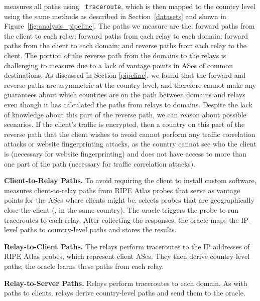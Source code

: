 \system{} measures all paths using {\tt 
traceroute}, which is then mapped to the country level using the same methods as 
described in Section~\ref{datasets} and shown in Figure~\ref{fig:analysis_pipeline}.
The paths we measure are the: forward paths from 
the client to each relay; forward paths from each relay to each domain; forward
paths from the client to each domain; and reverse paths from each relay to the 
client. 
The portion of the reverse path from the domains to the relays is
challenging to measure due to a lack of vantage points in ASes of common
destinations. As discussed in Section \ref{pipeline}, we found that  the
forward and reverse paths are asymmetric at the country level, and therefore
\system{} cannot make any guarantees about which countries are on the path
between  domains and relays even though it has calculated the paths from
relays to domains.   Despite the lack of knowledge about this part of the
reverse path,  we can reason about possible scenarios.  If the client's
traffic is encrypted, then a country on this part of
the reverse path that the client wishes to avoid cannot perform any  traffic correlation
attacks or website
fingerprinting attacks, as the country cannot see who the client is (necessary
for website fingerprinting) and does not have access to more than one part of
the path (necessary for traffic correlation attacks).



{\bf Client-to-Relay Paths.} 
To avoid requiring the client to install custom software, \system{}
measures client-to-relay paths from RIPE Atlas probes that serve as 
vantage points for the ASes where \system{} clients might be.  \system{} selects
probes that
are geographically close the client (\eg, in the same 
country). The oracle triggers the probe to run traceroutes
to each relay.  After collecting the responses, the oracle maps 
the IP-level paths to country-level paths and stores the results.

{\bf Relay-to-Client Paths.} The \system{} relays perform
traceroutes to the IP addresses of RIPE Atlas probes, which 
represent client ASes.  They then derive country-level paths; the
oracle learns these paths from each relay.  

{\bf Relay-to-Server Paths.} Relays perform 
traceroutes to each domain.  As with paths to clients,
relays derive country-level paths and send them to the oracle.

